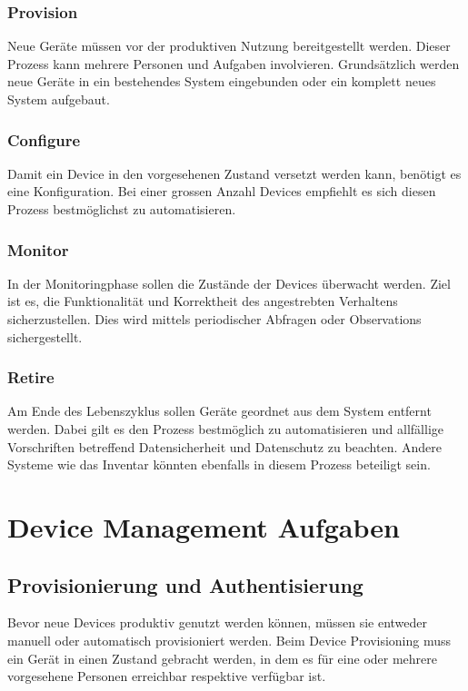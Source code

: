\subsubsection{Provision}
Neue Geräte müssen vor der produktiven Nutzung bereitgestellt werden. Dieser Prozess kann mehrere Personen und Aufgaben involvieren. Grundsätzlich werden neue Geräte in ein bestehendes System eingebunden oder ein komplett neues System aufgebaut.
\subsubsection{Configure}
Damit ein Device in den vorgesehenen Zustand versetzt werden kann, benötigt es eine Konfiguration. Bei einer grossen Anzahl Devices empfiehlt es sich diesen Prozess bestmöglichst zu automatisieren. 
\subsubsection{Monitor}
In der Monitoringphase sollen die Zustände der Devices überwacht werden. Ziel ist es, die Funktionalität und Korrektheit des angestrebten Verhaltens sicherzustellen. Dies wird mittels periodischer Abfragen oder Observations sichergestellt. 
\subsubsection{Retire}
Am Ende des Lebenszyklus sollen Geräte geordnet aus dem System entfernt werden. Dabei gilt es den Prozess bestmöglich zu automatisieren und allfällige Vorschriften betreffend Datensicherheit und Datenschutz zu beachten. Andere Systeme wie das Inventar könnten ebenfalls in diesem Prozess beteiligt sein.
\section{Device Management Aufgaben}
\subsection{Provisionierung und Authentisierung}
Bevor neue Devices produktiv genutzt werden können, müssen sie entweder manuell oder automatisch provisioniert werden. Beim Device Provisioning muss ein Gerät in einen Zustand gebracht werden, in dem es für eine oder mehrere vorgesehene Personen erreichbar respektive verfügbar ist.

